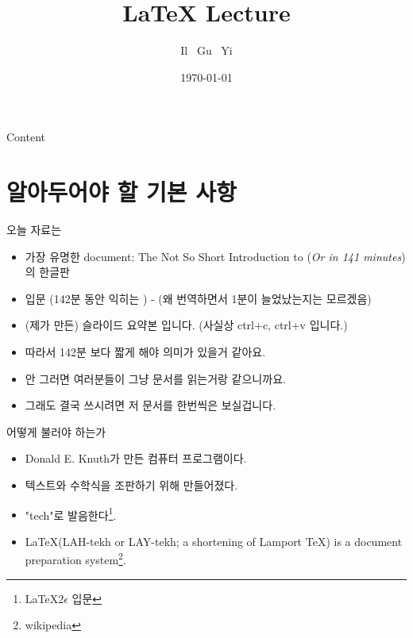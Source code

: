 \documentclass[10pt, mathserif, aspectratio=169]{beamer}
\title[\LaTeX{} Lecture]
{ %
    \LARGE
    \textbf{\LaTeX{} Lecture}
}
\author[Il Gu Yi]
{
    Il \ Gu \ Yi
}
\institute[]
{
  DLC \LaTeX{} Lecture
}
\date{\today}
\begin{document}
\begin{frame}
    \titlepage
\end{frame}


\begin{frame}{Content}{}
\tableofcontents
\end{frame}




\section{알아두어야 할 기본 사항}
\begin{frame}{오늘 자료는}
\begin{itemize}
  \item {} 가장 유명한 document: The Not So Short Introduction to \LaTeXe (\emph{Or \LaTeXe in 141 minutes})의 한글판
  \item \LaTeXe 입문 ({142분 동안 익히는 \LaTeXe}) - (왜 번역하면서 1분이 늘었났는지는 모르겠음)
  \item (제가 만든) 슬라이드 요약본 입니다. (사실상 ctrl+c, ctrl+v 입니다.)
    \pause
  \item 따라서 142분 보다 짧게 해야 의미가 있을거 같아요.
  \item 안 그러면 여러분들이 그냥 문서를 읽는거랑 같으니까요.
  \item 그래도 결국  쓰시려면 저 문서를 한번씩은 보실겁니다.
\end{itemize}
\end{frame}


\begin{frame}{어떻게 불러야 하는가}
\begin{itemize}
  \item {} Donald E. Knuth가 만든 컴퓨터 프로그램이다.
  \item {} 텍스트와 수학식을 조판하기 위해 만들어졌다.
  \item {} "tech"로 발음한다\footnote{\LaTeX 2$\epsilon$ 입문}.
  \item \LaTeX (LAH-tekh or LAY-tekh; a shortening of Lamport TeX) is a document preparation system\footnote{wikipedia}.
\end{itemize}
\end{frame}
\end{document}
